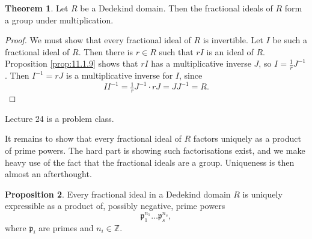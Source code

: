 \documentclass{article}
\newcommand{\Z}{\mathbb{Z}}
\theoremstyle{definition}\newtheorem{definition}{Definition}[subsection]
\theoremstyle{definition}\newtheorem{remark}[definition]{Remark}
\theoremstyle{definition}\newtheorem*{example}{Example}
\theoremstyle{definition}\newtheorem*{note}{Note}
\newtheorem{proposition}[definition]{Proposition}
\newtheorem{theorem}[definition]{Theorem}
\begin{document}
\begin{theorem}
Let $ R $ be a Dedekind domain. Then the fractional ideals of $ R $ form a group under multiplication.
\end{theorem}

\begin{proof}
We must show that every fractional ideal of $ R $ is invertible. Let $ I $ be such a fractional ideal of $ R $. Then there is $ r \in R $ such that $ rI $ is an ideal of $ R $. Proposition \ref{prop:11.1.9} shows that $ rI $ has a multiplicative inverse $ J $, so $ I = \tfrac{1}{r}J^{-1} $. Then $ I^{-1} = rJ $ is a multiplicative inverse for $ I $, since
$$ II^{-1} = \tfrac{1}{r}J^{-1} \cdot rJ = JJ^{-1} = R. $$
\end{proof}


Lecture 24 is a problem class.


It remains to show that every fractional ideal of $ R $ factors uniquely as a product of prime powers. The hard part is showing such factorisations exist, and we make heavy use of the fact that the fractional ideals are a group. Uniqueness is then almost an afterthought.

\begin{proposition}
Every fractional ideal in a Dedekind domain $ R $ is uniquely expressible as a product of, possibly negative, prime powers
$$ \mathfrak{p}_1^{n_1} \dots \mathfrak{p}_s^{n_s}, $$
where $ \mathfrak{p}_i $ are primes and $ n_i \in \Z $.
\end{proposition}
\end{document}
